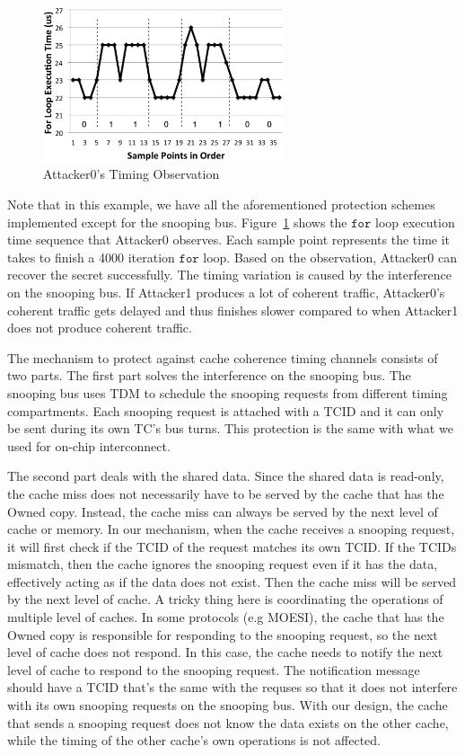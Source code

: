 \begin{figure}
    \begin{center}
        \includegraphics[width=2.79in]{figs/coherence_interference.eps}
        \caption{Attacker0's Timing Observation}
        \label{fig:coherence_interference}
    \end{center}
\end{figure}

Note that in this example, we have all the aforementioned protection schemes 
implemented except for the snooping bus.
Figure~\ref{fig:coherence_interference} shows the $\mathtt{for }$ loop execution time 
sequence that Attacker0 observes. Each
sample point represents the time it takes to finish a 4000 iteration $\mathtt{for }$ 
loop. Based on the observation, Attacker0
can recover the secret successfully. The timing variation is caused by the 
interference on the snooping bus. If Attacker1
produces a lot of coherent traffic, Attacker0's coherent traffic gets delayed 
and thus finishes slower compared to
when Attacker1 does not produce coherent traffic. 

The mechanism to protect against cache coherence timing channels consists of 
two parts. The first part solves the interference on the snooping bus. The 
snooping bus uses TDM to schedule the snooping requests from different timing
compartments. Each snooping request is attached with a TCID and it can only be 
sent during its own TC's bus turns.
This protection is the same with what we used for on-chip interconnect. 

The second part deals
with the shared data. Since the shared data is read-only, the cache miss does 
not necessarily have to be served by
the cache that has the Owned copy. Instead, the cache miss can always be served 
by the next level of cache or memory.
In our mechanism, when the cache receives a snooping request, it will first 
check if the TCID of the request matches its
own TCID. If the TCIDs mismatch, then the cache ignores the snooping request 
even if it has the data, effectively acting
as if the data does not exist. Then the cache miss will be served by the next 
level of cache. A tricky thing here is
coordinating the operations of multiple level of caches. In some protocols (e.g 
MOESI), the cache that has the Owned copy
is responsible for responding to the snooping request, so the next level of 
cache does not respond. In this case, the
cache needs to notify the next level of cache to respond to the snooping 
request. The notification message should
have a TCID that's the same with the requses so that it does not interfere with 
its own snooping requests on the snooping bus. With our design, the cache that 
sends a snooping request does not know the data exists on the other cache, 
while
the timing of the other cache's own operations is not affected.
 
